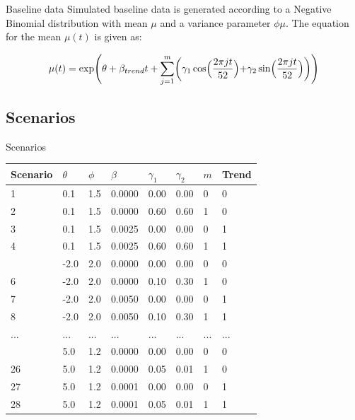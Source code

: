 \documentclass[aspectratio=169]{beamer}
\begin{document}
\begin{frame}{Baseline data}
Simulated baseline data is generated according to a Negative Binomial
distribution with mean \(\mu\) and a variance parameter \(\phi\mu\). The
equation for the mean \(\mu(t)\) is given as:

\begin{equation}
\mu(t)=\exp\Biggl(\theta+\beta_{trend} t+\sum_{j=1}^m \biggl(\gamma_1 \cos\Bigl(\frac{2\pi jt}{52}\Bigl) + \gamma_2 \sin \Bigl(\frac{2\pi jt}{52} \Bigl)\biggl)\Biggl)
\end{equation}
\end{frame}

\hypertarget{scenarios}{%
\subsection{Scenarios}\label{scenarios}}

\begin{frame}{Scenarios}
\tiny

\begin{table}[H]
\centering\begingroup\fontsize{10}{12}\selectfont

\begin{tabular}[t]{llllllll}
\toprule
Scenario & $\theta$ & $\phi$ & $\beta$ & $\gamma_1$ & $\gamma_2$ & $m$ & Trend\\
\midrule
1 & 0.1 & 1.5 & 0.0000 & 0.00 & 0.00 & 0 & 0\\
2 & 0.1 & 1.5 & 0.0000 & 0.60 & 0.60 & 1 & 0\\
3 & 0.1 & 1.5 & 0.0025 & 0.00 & 0.00 & 0 & 1\\
4 & 0.1 & 1.5 & 0.0025 & 0.60 & 0.60 & 1 & 1\\
\addlinespace
5 & -2.0 & 2.0 & 0.0000 & 0.00 & 0.00 & 0 & 0\\
6 & -2.0 & 2.0 & 0.0000 & 0.10 & 0.30 & 1 & 0\\
7 & -2.0 & 2.0 & 0.0050 & 0.00 & 0.00 & 0 & 1\\
8 & -2.0 & 2.0 & 0.0050 & 0.10 & 0.30 & 1 & 1\\
\addlinespace
... & ... & ... & ... & ... & ... & ... & ...\\
\addlinespace
25 & 5.0 & 1.2 & 0.0000 & 0.00 & 0.00 & 0 & 0\\
26 & 5.0 & 1.2 & 0.0000 & 0.05 & 0.01 & 1 & 0\\
27 & 5.0 & 1.2 & 0.0001 & 0.00 & 0.00 & 0 & 1\\
28 & 5.0 & 1.2 & 0.0001 & 0.05 & 0.01 & 1 & 1\\
\bottomrule
\end{tabular}
\endgroup{}
\end{table}

\normalsize
\end{frame}
\end{document}
